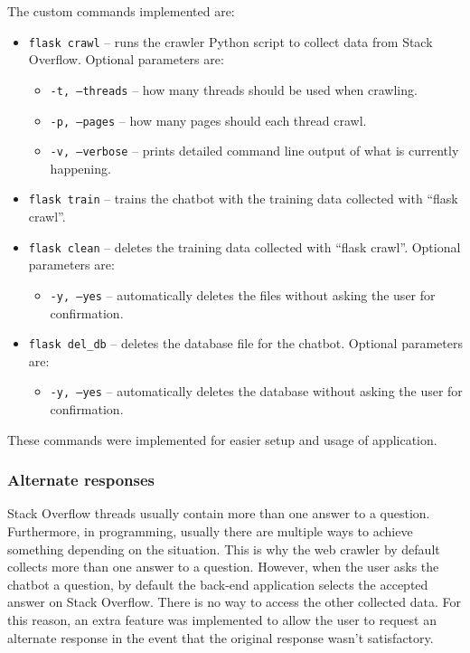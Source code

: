 \documentclass[12pt,a4paper]{article}
\begin{document}
The custom commands implemented are:
\begin{itemize}
    \item \texttt{flask crawl} – runs the crawler Python script to collect data from Stack Overflow. Optional parameters are:
    \begin{itemize}
        \item \texttt{-t, --threads} – how many threads should be used when crawling.
        \item \texttt{-p, --pages} – how many pages should each thread crawl.
        \item \texttt{-v, --verbose} – prints detailed command line output of what is currently happening.
    \end{itemize}
    \item \texttt{flask train} – trains the chatbot with the training data collected with “flask crawl”.
    \item \texttt{flask clean} – deletes the training data collected with “flask crawl”. Optional parameters are:
    \begin{itemize}
        \item \texttt{-y, --yes} – automatically deletes the files without asking the user for confirmation.
    \end{itemize}
    \item \texttt{flask del\_db} – deletes the database file for the chatbot. Optional parameters are:
    \begin{itemize}
        \item \texttt{-y, --yes} – automatically deletes the database without asking the user for confirmation.
    \end{itemize}        
\end{itemize}

These commands were implemented for easier setup and usage of application.

\subsubsection{Alternate responses}
Stack Overflow threads usually contain more than one answer to a question. Furthermore, in programming, usually there are multiple ways to achieve something depending on the situation. This is why the web crawler by default collects more than one answer to a question. However, when the user asks the chatbot a question, by default the back-end application selects the accepted answer on Stack Overflow. There is no way to access the other collected data. For this reason, an extra feature was implemented to allow the user to request an alternate response in the event that the original response wasn’t satisfactory.
\end{document}
